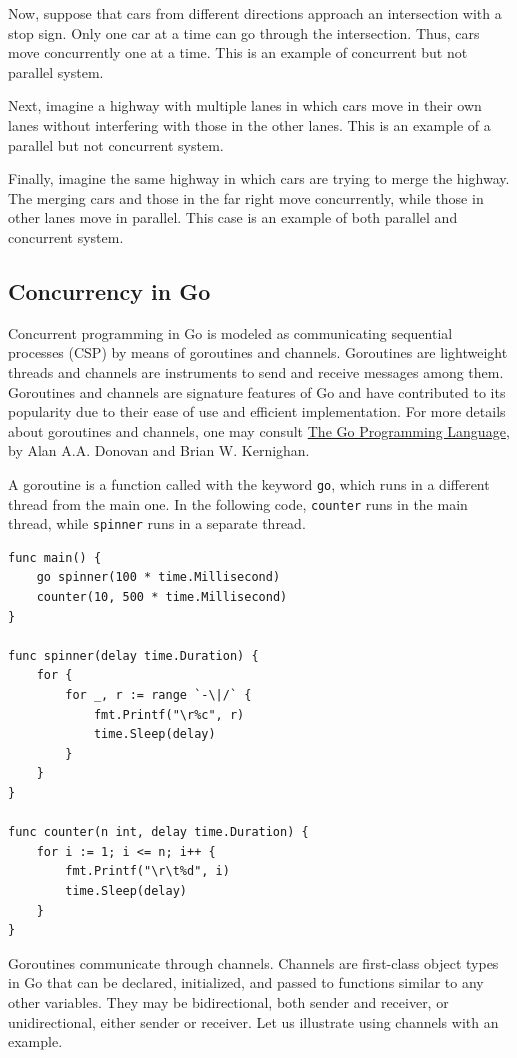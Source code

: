 \documentclass[11pt]{article}
\begin{document}
Now, suppose that cars from different directions approach an intersection with a stop sign. Only one car at a time can go through the intersection. Thus, cars move concurrently one at a time. This is an example of concurrent but not parallel system.

Next, imagine a highway with multiple lanes in which cars move in their own lanes without interfering with those in the other lanes. This is an example of a parallel but not concurrent system.

Finally, imagine the same highway in which cars are trying to merge the highway. The merging cars and those in the far right move concurrently, while those in other lanes move in parallel. This case is an example of both parallel and concurrent system.

\subsection{Concurrency in Go}
\label{sec:orgheadline3}
Concurrent programming in Go is modeled as communicating sequential processes (CSP) by means of goroutines and channels. Goroutines are lightweight threads and channels are instruments to send and receive messages among them. Goroutines and channels are signature features of Go and have contributed to its popularity due to their ease of use and efficient implementation. For more details about goroutines and channels, one may consult \href{https://dl.acm.org/citation.cfm?id=2851099}{The Go Programming Language}, by Alan A.A. Donovan and Brian W. Kernighan.

A goroutine is a function called with the keyword \texttt{go}, which runs in a different thread from the main one. In the following code, \texttt{counter} runs in the main thread, while \texttt{spinner} runs in a separate thread.
\begin{verbatim}
func main() {
    go spinner(100 * time.Millisecond)
    counter(10, 500 * time.Millisecond)
}

func spinner(delay time.Duration) {
    for {
        for _, r := range `-\|/` {
            fmt.Printf("\r%c", r)
            time.Sleep(delay)
        }
    }
}

func counter(n int, delay time.Duration) {
    for i := 1; i <= n; i++ {
        fmt.Printf("\r\t%d", i)
        time.Sleep(delay)
    }
}
\end{verbatim}
Goroutines communicate through channels. Channels are first-class object types in Go that can be declared, initialized, and passed to functions similar to any other variables. They may be bidirectional, both sender and receiver, or unidirectional, either sender or receiver. Let us illustrate using channels with an example.
\end{document}
